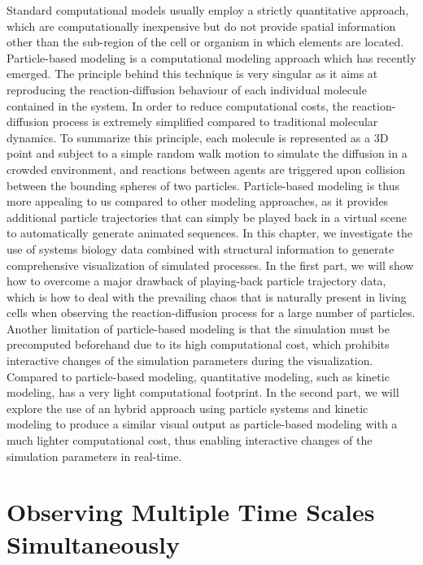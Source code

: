 Standard computational models usually employ a strictly quantitative approach, which are computationally inexpensive but do not provide spatial information other than the sub-region of the cell or organism in which elements are located.
Particle-based modeling is a computational modeling approach which has recently emerged.
The principle behind this technique is very singular as it aims at reproducing the reaction-diffusion behaviour of each individual molecule contained in the system.
In order to reduce computational costs, the reaction-diffusion process is extremely simplified compared to traditional molecular dynamics.
To summarize this principle, each molecule is represented as a 3D point and subject to a simple random walk motion to simulate the diffusion in a crowded environment, and reactions between agents are triggered upon collision between the bounding spheres of two particles.
Particle-based modeling is thus more appealing to us compared to other modeling approaches, as it provides additional particle trajectories that can simply be played back in a virtual scene to automatically generate animated sequences.
In this chapter, we investigate the use of systems biology data combined with structural information to generate comprehensive visualization of simulated processes.
In the first part, we will show how to overcome a major drawback of playing-back particle trajectory data, which is how to deal with the prevailing chaos that is naturally present in living cells when observing the reaction-diffusion process for a large number of particles.
Another limitation of particle-based modeling is that the simulation must be precomputed beforehand due to its high computational cost, which prohibits interactive changes of the simulation parameters during the visualization.
Compared to particle-based modeling, quantitative modeling, such as kinetic modeling, has a very light computational footprint.
In the second part, we will explore the use of an hybrid approach using particle systems and kinetic modeling to produce a similar visual output as particle-based modeling with a much lighter computational cost, thus enabling interactive changes of the simulation parameters in real-time. 

\section{Observing Multiple Time Scales Simultaneously}


